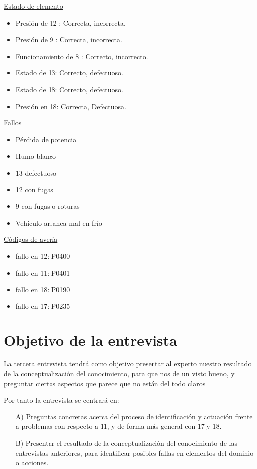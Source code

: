 \documentclass[a4paper,12pt]{article}
\begin{document}
\underline{Estado de elemento}
\begin{itemize}
\item Presión de 12 : Correcta, incorrecta.
\item Presión de 9 : Correcta, incorrecta.
\item Funcionamiento de 8 : Correcto, incorrecto.
\item Estado de 13: Correcto, defectuoso.
\item Estado de 18: Correcto, defectuoso.
\item Presión en 18: Correcta, Defectuosa.
\end{itemize}

\underline{Fallos}
\begin{itemize}
\item Pérdida de potencia
\item Humo blanco
\item 13 defectuoso
\item 12 con fugas
\item 9 con fugas o roturas
\item Vehículo arranca mal en frío
\end{itemize}


\underline{Códigos de avería}
\begin{itemize}
\item fallo en 12: P0400
\item fallo en 11: P0401
\item fallo en 18: P0190
\item fallo en 17: P0235
\end{itemize}
 
\section{Objetivo de la entrevista}
La tercera entrevista tendrá como objetivo presentar al experto nuestro resultado  de la conceptualización del conocimiento, para que nos de un visto bueno, y preguntar ciertos aspectos que parece que no están del todo claros.

Por tanto la entrevista se centrará en:

\begin{itemize}
 \item[A)] Preguntas concretas acerca del proceso de identificación y actuación frente a problemas con respecto a 11, y de forma más general con 17 y 18.
 \item[B)] Presentar el resultado de la conceptualización del conocimiento de las entrevistas anteriores, para identificar posibles fallas en elementos del dominio o acciones.
 \end{itemize}
 
\end{document}
